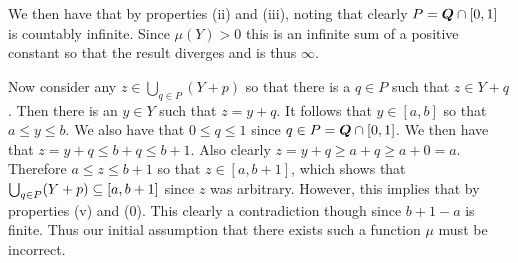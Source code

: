 \begin{questions}
{{    We then have that
    by properties (ii) and (iii), noting that clearly $P = \rats \cap [0,1]$ is countably infinite.
    Since $\mu(Y) > 0$ this is an infinite sum of a positive constant so that the result diverges and is thus $\infty$.

    Now consider any $z \in \bigcup_{q \in P} (Y + p)$ so that there is a $q \in P$ such that $z \in Y + q$.
    Then there is an $y \in Y$ such that $z = y + q$.
    It follows that $y \in [a, b]$ so that $a \leq y \leq b$.
    We also have that $0 \leq q \leq 1$ since $q \in P = \rats \cap [0,1]$.
    We then have that $z = y + q \leq b + q \leq b + 1$.
    Also clearly $z = y + q \geq a + q \geq a + 0 = a$.
    Therefore $a \leq z \leq b+1$ so that $z \in [a, b+1]$, which shows that $\bigcup_{q \in P} (Y + p) \ss [a, b+1]$ since $z$ was arbitrary.
    However, this implies that
    by properties (v) and (0).
    This clearly a contradiction though since $b+1-a$ is finite.
    Thus our initial assumption that there exists such a function $\mu$ must be incorrect.
  }
}

\end{questions}

